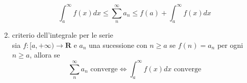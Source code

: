 \documentclass{exam}
\begin{document}
\begin{enumerate}
				\begin{equation}
					\int_a^\infty f(x)dx	\le \sum_n^\infty a_n \le f(a)+ \int_a^\infty f(x)dx 
				\end{equation}
			\item{criterio dell'integrale per le serie}\\
				sia $f:[a,+\infty)\rightarrow\mathbf{R}$ e $a_n$ una sucessione con $n\geq a$ se $f(n)=a_n$ per ogni $n\geq a$, allora se
				\begin{equation}
					\sum_n^\infty a_n \textrm{ converge}\Leftrightarrow \int_a^\infty f(x)dx \textrm{ converge}
				\end{equation}

		\end{enumerate}
\end{document}
